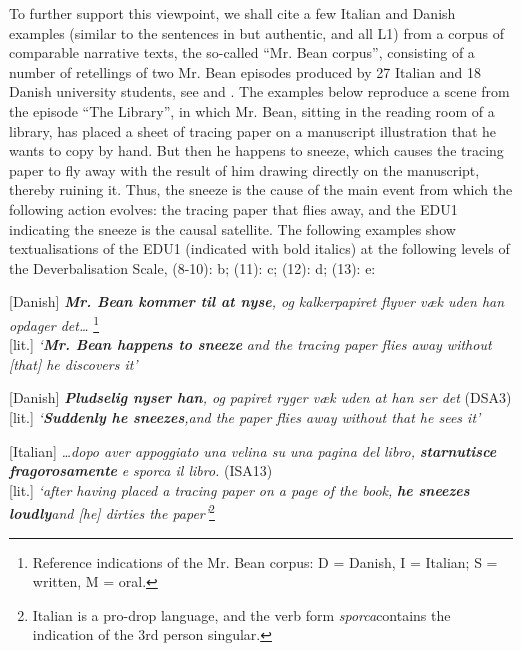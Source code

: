 \documentclass[output=paper]{LSP/langsci}
\begin{document}
To further support this viewpoint, we shall cite a few Italian and Danish examples (similar to the sentences in  but authentic, and all L1) from a corpus of comparable narrative texts, the so-called ``Mr. Bean corpus'', consisting of a number of retellings of two Mr. Bean episodes produced by 27 Italian and 18 Danish university students, see \cite{SkytteEtAl1999} and \citet{Korzen2007b}. The examples below reproduce a scene from the episode ``The Library'', in which Mr. Bean, sitting in the reading room of a library, has placed a sheet of tracing paper on a manuscript illustration that he wants to copy by hand. But then he happens to sneeze, which causes the tracing paper to fly away with the result of him drawing directly on the manuscript, thereby ruining it. Thus, the sneeze is the cause of the main event from which the following action evolves: the tracing paper that flies away, and the EDU1 indicating the sneeze is the causal satellite. The following examples show textualisations of the EDU1 (indicated with bold italics) at the following levels of the Deverbalisation Scale, (8-10): b; (11): c; (12): d; (13): e:

\ea\label{ex:korzen:8}
\textup{[Danish]} \textbf{\textit{Mr. Bean kommer til at nyse}}\textit{, og kalkerpapiret flyver væk uden han opdager det\ldots} \citep[DSA9]{SkytteEtAl1999}\footnote{Reference indications of the Mr. Bean corpus: D = Danish, I = Italian; S = written, M = oral.}\\

\textup{[lit.]} \textit{`}\textbf{\textit{Mr. Bean happens to sneeze}}\textit{ and the tracing paper flies away without [that] he discovers it'}
\z

\ea\label{ex:korzen:9}
\textup{[Danish]} \textbf{\textit{Pludselig nyser han}}\textit{, og papiret ryger væk uden at han ser det} (DSA3)\\
\textup{[lit.]} \textit{ `}\textbf{\textit{Suddenly he sneezes}}\textit{,and the paper flies away without that he sees it'}
\z

\ea\label{ex:korzen:10}
\textup{[Italian]} \textit{\ldots dopo aver appoggiato una velina su una pagina del libro, }\textbf{\textit{starnutisce fragorosamente }}\textit{e sporca il libro.} (ISA13)\\

\textup{[lit.]} \textit{`after having placed a tracing paper on a page of the book,} \textbf{\textit{he sneezes loudly}}\textit{and [he] dirties the paper'}\footnote{Italian is a pro-drop language, and the verb form \textit{sporca}contains the indication of the 3rd person singular.}
\z
\end{document}
